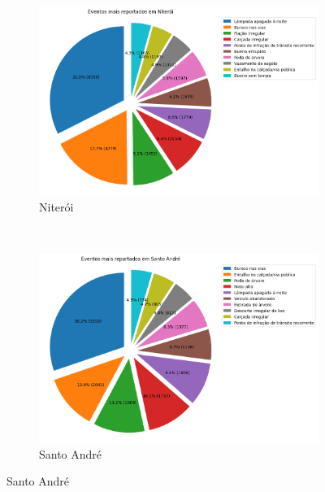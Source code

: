 \begin{figure}[htb]
	\centering
	\caption{10 Principais Tipos de Eventos mais criados por Cidade}\label{fig:city-events}
	\begin{subfigure}[b]{0.317\textwidth}
		\includegraphics[width=\textwidth]{images/pie_event_distribution_niteroi.png}
		\caption{Niterói}
		\label{fig:niteroi-pie}
	\end{subfigure} ~
	\begin{subfigure}[b]{0.317\textwidth}
		\includegraphics[width=\textwidth]{images/pie_event_distribution_sa.png}
		\caption{Santo André}
		\label{fig:santo-andre-pie}

\end{subfigure}
\end{figure}
